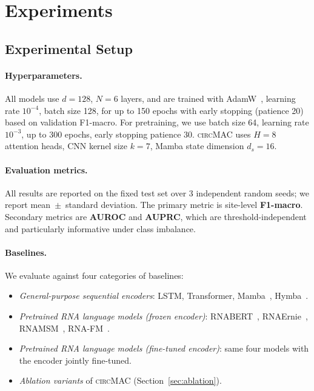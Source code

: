 \documentclass[11pt]{article}
\newcommand{\model}{\textsc{circMAC}}
\begin{document}
\section{Experiments}

\subsection{Experimental Setup}

\paragraph{Hyperparameters.}
All models use $d = 128$, $N = 6$ layers, and are trained with
AdamW~\cite{adamw}, learning rate $10^{-4}$, batch size 128, for up to 150
epochs with early stopping (patience 20) based on validation F1-macro.
For pretraining, we use batch size 64, learning rate $10^{-3}$, up to 300
epochs, early stopping patience 30.
\model{} uses $H = 8$ attention heads, CNN kernel size $k = 7$,
Mamba state dimension $d_s = 16$.

\paragraph{Evaluation metrics.}
All results are reported on the fixed test set over 3 independent random
seeds; we report mean~$\pm$~standard deviation.
The primary metric is site-level \textbf{F1-macro}.
Secondary metrics are \textbf{AUROC} and \textbf{AUPRC}, which are
threshold-independent and particularly informative under class imbalance.

\paragraph{Baselines.}
We evaluate against four categories of baselines:
\begin{itemize}[leftmargin=*]
  \item \textit{General-purpose sequential encoders}:
        LSTM, Transformer, Mamba~\cite{mamba}, Hymba~\cite{hymba}.
  \item \textit{Pretrained RNA language models (frozen encoder)}:
        RNABERT~\cite{rnabert}, RNAErnie~\cite{rnaernie},
        RNAMSM~\cite{rnamsm}, RNA-FM~\cite{rnafm}.
  \item \textit{Pretrained RNA language models (fine-tuned encoder)}:
        same four models with the encoder jointly fine-tuned.
  \item \textit{Ablation variants} of \model{} (Section~\ref{sec:ablation}).
\end{itemize}
\end{document}
